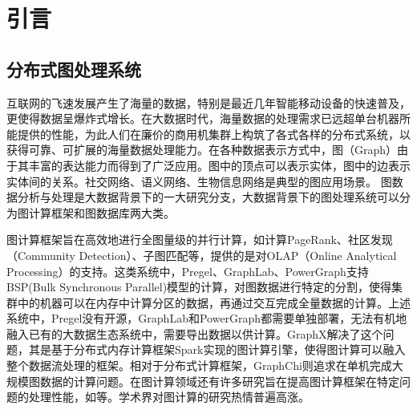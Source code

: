 
\chapter{引言}

\section{分布式图处理系统}
互联网的飞速发展产生了海量的数据，特别是最近几年智能移动设备的快速普及，更使得数据呈爆炸式增长。在大数据时代，海量数据的处理需求已远超单台机器所能提供的性能，为此人们在廉价的商用机集群上构筑了各式各样的分布式系统，以获得可靠、可扩展的海量数据处理能力。在各种数据表示方式中，图（Graph）由于其丰富的表达能力而得到了广泛应用。图中的顶点可以表示实体，图中的边表示实体间的关系。社交网络、语义网络、生物信息网络是典型的图应用场景。
图数据分析与处理是大数据背景下的一大研究分支\supercite{big_data}，大数据背景下的图处理系统可以分为图计算框架和图数据库两大类。

图计算框架旨在高效地进行全图量级的并行计算，如计算PageRank\supercite{pagerank}、社区发现\supercite{community_detection}（Community Detection）、子图匹配\supercite{subgraph_listing}等，提供的是对OLAP（Online Analytical Processing）的支持。这类系统中，Pregel\supercite{pregel}、GraphLab\supercite{graphlab}、PowerGraph\supercite{powergraph}支持BSP\supercite{BSP}(Bulk Synchronous Parallel)模型的计算，对图数据进行特定的分割，使得集群中的机器可以在内存中计算分区的数据，再通过交互完成全量数据的计算。上述系统中，Pregel没有开源，GraphLab和PowerGraph都需要单独部署，无法有机地融入已有的大数据生态系统中，需要导出数据以供计算。GraphX\supercite{graphx}解决了这个问题，其是基于分布式内存计算框架Spark\supercite{spark}实现的图计算引擎，使得图计算可以融入整个数据流处理的框架。相对于分布式计算框架，GraphChi\supercite{graphchi}则追求在单机完成大规模图数据的计算问题。在图计算领域还有许多研究旨在提高图计算框架在特定问题的处理性能，如\supercites{xuning_LogGP,xuning_2,shaoxia_1,shaoxia_2,shaoxia_3}等。学术界对图计算的研究热情普遍高涨。

